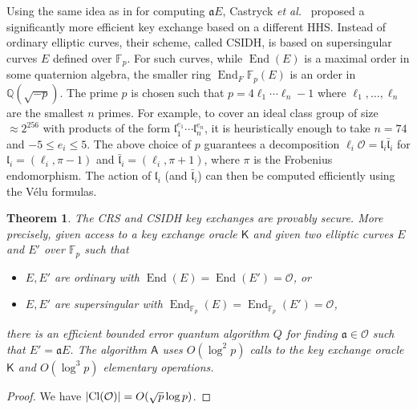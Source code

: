 \documentclass[11pt]{article}
\theoremstyle{plain}
\newtheorem{theorem}{Theorem}[section]
\theoremstyle{definition}
\DeclareMathOperator{\groupofend}{End} %
\DeclarePairedDelimiter{\abs}{\lvert}{\rvert}
\def\Q{\mathbb{Q}}
\def\F{\mathbb{F}}
\newcommand{\kex}{\mathsf{K}}
\renewcommand{\O}{\mathcal{O}}
\newcommand{\clo}{\text{Cl}(\mathcal{O})}
\begin{document}
Using the same idea as in \cite{de2018towards} for computing $\mathfrak{a} E$, Castryck \textit{et 
al.}~\cite{castryck2018csidh} proposed a significantly more efficient key exchange based on a 
different HHS. Instead of ordinary elliptic curves, their scheme, called CSIDH, is based on
supersingular curves $E$ defined over $\F_p$. For such curves, while $\groupofend(E)$ is a maximal 
order in some quaternion algebra, the smaller ring $\groupofend_F{\F_p}(E)$ is an order in 
$\Q(\sqrt{-p})$. The prime $p$ is chosen such that $p = 4 \ell_1 \cdots \ell_n - 1$ where $\ell_1, 
\dots, \ell_n$ are the smallest $n$ primes. For example, to cover an ideal class group of size 
$\approx 2^{256}$ with products of the form $\mathfrak{l}_1^{e_1} \cdots \mathfrak{l}_n^{e_n}$, it 
is heuristically enough to take $n = 74$ and $-5 \le e_i \le 5$. The above choice of $p$ guarantees 
a decomposition $\ell_i \O = \mathfrak{l}_i \bar{\mathfrak{l}}_i$ for $\mathfrak{l}_i = (\ell_i, \pi 
- 1)$ and $\bar{\mathfrak{l}}_i = (\ell_i, \pi + 1)$, where $\pi$ is the Frobenius endomorphism. The 
action of $\mathfrak{l}_i$ (and $\bar{\mathfrak{l}}_i$) can then be computed efficiently using the 
V\'elu formulas.

\begin{theorem}
	The CRS and CSIDH key exchanges are provably secure. More precisely, given access to a key 
	exchange oracle $\kex$ and given two elliptic curves $E$ and $E'$ over $\F_p$ such that
	\begin{itemize}[topsep = 0pt, itemsep = 0pt, parsep = 0pt]
		\item $E, E'$ are ordinary with $\groupofend(E) = \groupofend(E') = \O$, or
		\item $E, E'$ are supersingular with $\groupofend_{\F_p}(E) = \groupofend_{\F_p}(E') = \O$,
	\end{itemize}
	there is an efficient bounded error quantum algorithm $Q$ for finding $\mathfrak{a} \in 
	\O$ such that $E' = \mathfrak{a} E$. The algorithm $\mathsf{A}$ uses $O(\log^2 p)$ calls to the 
	key exchange oracle $\kex$ and $O(\log^3 p)$ elementary operations.
\end{theorem}
\begin{proof}
    We have $\abs{\clo} = O(\sqrt{p} \log p)$.
\end{proof}








\newpage


\end{document}
